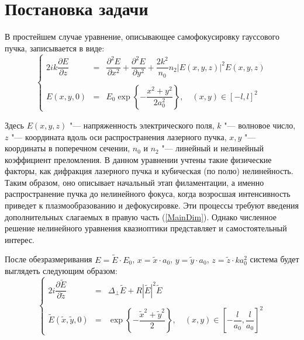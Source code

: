 \section{Постановка задачи}

В простейшем случае уравнение, описывающее самофокусировку гауссового пучка, записывается в виде:
\begin{equation}\label{MainDim}
    \left\{
	\begin{array}{rcl}
		2ik\dfrac{\partial E}{\partial z}&=&\dfrac{\partial^2 E}{\partial x^2}+
		\dfrac{\partial^2 E}{\partial y^2} + \dfrac{2k^2}{n_0}n_2\left|E\left(x,y,z\right)\right|^2E\left(x,y,z\right)\\
        \\
		E(x,y,0)&=&E_0\exp\left\{-\dfrac{x^2+y^2}{2a_0^2}\right\},\quad (x,y)\in[-l,l]^2
	\end{array}
	\right.
\end{equation}

Здесь $E\left(x,y,z\right)$ "--- напряженность электрического поля, $k$ "--- волновое число, $z$ "--- координата вдоль оси распространения лазерного пучка, $x,y$ "--- координаты в поперечном сечении, $n_0$ и $n_2$ "--- линейный и нелинейный коэффициент преломления.
В данном уравнении учтены такие физические факторы, как дифракция лазерного пучка и кубическая (по полю) нелинейность.
Таким образом, оно описывает начальный этап филаментации, а именно распространение пучка до нелинейного фокуса, когда возросшая интенсивность приведет к плазмообразованию и дефокусировке.
Эти процессы требуют введения дополнительных слагаемых в правую часть (\ref{MainDim}).
Однако численное решение нелинейного уравнения квазиоптики представляет и самостоятельный интерес.

После обезразмеривания $E=\tilde{E}\cdot E_0$, $x=\tilde{x}\cdot a_0$, $y=\tilde{y}\cdot a_0$, $z=\tilde{z}\cdot ka_0^2$ система будет выглядеть следующим образом:
\begin{equation}\label{MainNoDim}
    \left\{
	\begin{array}{rcl}
		2i\dfrac{\partial \tilde{E}}{\partial \tilde{z}}&=&\Delta_{\perp}\tilde{E} + R\left|\tilde{E}\right|^2\tilde{E}\\
        \\		\tilde{E}(\tilde{x},\tilde{y},0)&= &\exp\left\{-\dfrac{\tilde{x}^2+\tilde{y}^2}{2}\right\}, \quad (x,y)\in\left[-\dfrac{l}{a_0},\dfrac{l}{a_0}\right]^2
	\end{array}
	\right.
\end{equation}

